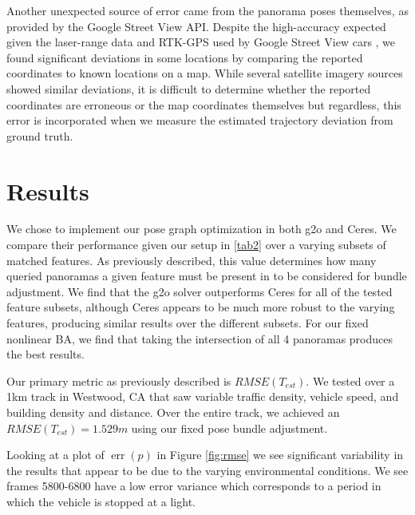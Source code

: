 \documentclass[conference]{IEEEtran}
\begin{document}
Another unexpected source of error came from the panorama poses themselves, as provided by the Google Street View API. Despite the high-accuracy expected given the laser-range data and RTK-GPS used by Google Street View cars \cite{gsv}, we found significant deviations in some locations by comparing the reported coordinates to known locations on a map. While several satellite imagery sources showed similar deviations, it is difficult to determine whether the reported coordinates are erroneous or the map coordinates themselves but regardless, this error is incorporated when we measure the estimated trajectory deviation from ground truth.


\section{Results}


We chose to implement our pose graph optimization in both g2o and Ceres. We compare their performance given our setup in \ref{tab2} over a varying subsets of matched features. As previously described, this value determines how many queried panoramas a given feature must be present in to be considered for bundle adjustment. We find that the g2o solver outperforms Ceres for all of the tested feature subsets, although Ceres appears to be much more robust to the varying features, producing similar results over the different subsets. For our fixed nonlinear BA, we find that taking the intersection of all 4 panoramas produces the best results.

Our primary metric as previously described is $RMSE(T_{est})$. We tested over a 1km track in Westwood, CA that saw variable traffic density, vehicle speed, and building density and distance. Over the entire track, we achieved an $RMSE(T_{est})=1.529m$ using our fixed pose bundle adjustment.

Looking at a plot of $\operatorname{err}(p)$ in Figure \ref{fig:rmse} we see significant variability in the results that appear to be due to the varying environmental conditions. We see frames 5800-6800 have a low error variance which corresponds to a period in which the vehicle is stopped at a light. 
\end{document}
